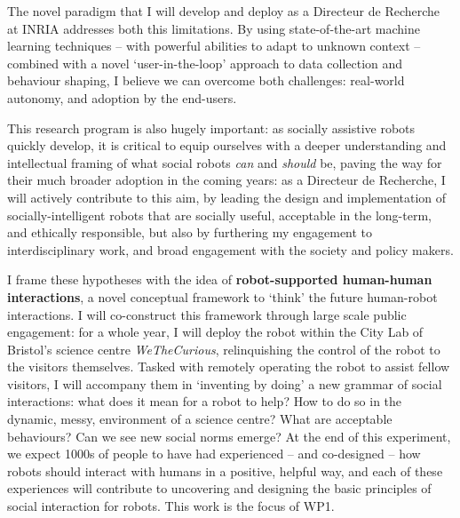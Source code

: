 The novel paradigm that I will develop and deploy as a Directeur de
Recherche at INRIA addresses both this limitations. By using state-of-the-art
machine learning techniques -- with powerful abilities to adapt to unknown context
-- combined with a novel `user-in-the-loop' approach to data collection and
behaviour shaping, I believe we can overcome both challenges: real-world
autonomy, and adoption by the end-users.

This research program is also hugely important: as socially assistive robots quickly
develop, it is critical to equip ourselves with a deeper understanding and
intellectual framing of what social robots \emph{can} and \emph{should} be,
paving the way for their much broader adoption in the coming years: as a
Directeur de Recherche, I will actively contribute to this aim, by leading the
design and implementation of socially-intelligent robots that are socially
useful, acceptable in the long-term, and ethically responsible, but also by
furthering my engagement to interdisciplinary work, and broad engagement with
the society and policy makers.














I frame these hypotheses with the idea of \textbf{robot-supported human-human
interactions}, a novel conceptual framework to `think' the future human-robot
interactions. I will co-construct this framework through large scale public
engagement: for a whole year, I will deploy the \project robot within the City
Lab of Bristol's science centre \emph{WeTheCurious}, relinquishing the control
of the robot to the visitors themselves. Tasked with remotely operating the
robot to assist fellow visitors, I will accompany them in `inventing by doing' a
new grammar of social interactions: what does it mean for a robot to help? How
to do so in the dynamic, messy, environment of a science centre? What are acceptable
behaviours? Can we see new social norms emerge? At the end of this experiment,
we expect 1000s of people to have had experienced -- and co-designed -- how
robots should interact with humans in a positive, helpful way, and each of these
experiences will contribute to uncovering and designing the basic principles of
social interaction for robots. This work is the focus of WP1.


